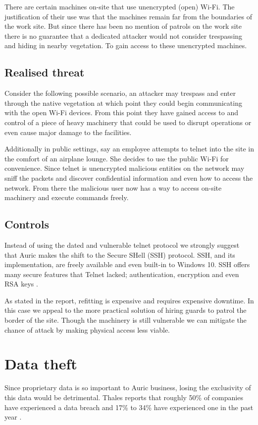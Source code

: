 \documentclass{article}
\begin{document}
\begin{multicols}{2}
    There are certain machines on-site that use unencrypted (open) Wi-Fi. The
    justification of their use was
    that the machines remain far from the boundaries of the
    work site. But since there has been no mention of patrols on the work site
    there is no guarantee that a dedicated attacker would not consider trespassing
    and hiding in nearby vegetation. To gain access to these unencrypted
    machines.

    \subsection{Realised threat}
    Consider the following possible scenario,
    an attacker may trespass and enter through the native vegetation at which point
    they could begin communicating with the open Wi-Fi devices. From this point
    they have gained access to and control of a piece of heavy machinery
    that could be used to
    disrupt operations or even cause major damage to the facilities.

    Additionally
    in public settings, say an employee attempts to telnet into the site in the
    comfort of an airplane lounge. She decides to use the public Wi-Fi for
    convenience. Since telnet is unencrypted malicious entities on the network
    may sniff the packets and discover confidential information and
    even how to access
    the network. From there the malicious user
    now has a way to access on-site machinery and execute commands freely.

    \subsection{Controls}
    Instead of using the dated 
    and vulnerable telnet protocol we strongly suggest
    that Auric makes the shift to the Secure SHell (SSH) protocol. SSH, and its
    implementation, are freely available and even built-in to Windows 10.
    SSH offers many secure features that Telnet lacked; authentication,
    encryption and even RSA keys \cite{ssh}.

    As stated in the report, refitting is expensive and requires expensive
    downtime. In this case we appeal to the more practical solution of hiring
    guards to patrol the border of the site. Though the machinery is still
    vulnerable we can mitigate the chance of attack by making physical access
    less viable.

    \section{Data theft}
    Since proprietary data is so important to Auric business,
    losing the exclusivity of this
    data would be detrimental.
    Thales reports that roughly 50\% of companies have
    experienced a data breach and 17\% to 34\% have experienced one in the past year
    \cite{thales}.


\end{multicols}
\end{document}
